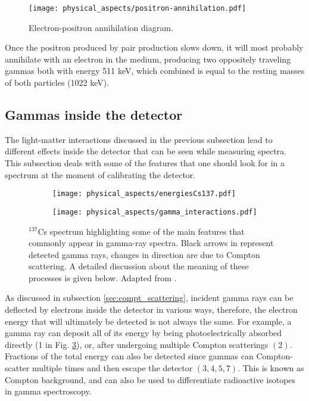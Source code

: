 \begin{figure}[H]
  \centering
  \texttt{[image: physical\_aspects/positron-annihilation.pdf]}
  \caption{\label{fig:positron_annihilation_diagram}Electron-positron annihilation diagram.}
\end{figure}

Once the positron produced by pair production slows down, it will most probably annihilate with an electron in the medium, producing two oppositely traveling gammas both with energy 511 \unit{\kilo\eV}, which combined is equal to the resting masses of both particles (1022 \unit{\kilo\eV}).

\subsection{Gammas inside the detector}\label{sec:gammas_in_the_detector}

The light-matter interactions discussed in the previous subsection lead to different effects inside the detector that can be seen while measuring spectra. This subsection deals with some of the features that one should look for in a spectrum at the moment of calibrating the detector.

\begin{figure}[H]
  \centering
  \begin{subfigure}[t]{0.7\textwidth}
    \texttt{[image: physical\_aspects/energiesCs137.pdf]}
    \caption{\label{sfig:spectrum_description}}
  \end{subfigure}
  \hfill
  \begin{subfigure}[t]{0.28\textwidth}
    \texttt{[image: physical\_aspects/gamma\_interactions.pdf]}
    \caption{\label{sfig:gamma_scattering}}
  \end{subfigure}
  \caption{\label{fig:Cs137_description}$^{137}$Cs spectrum highlighting some of the main features that commonly appear in gamma-ray spectra. Black arrows in  represent detected gamma rays, changes in direction are due to Compton scattering. A detailed discussion about the meaning of these processes is given below. Adapted from \cite{Notas-instrumentacion}.}
\end{figure}

As discussed in subsection \ref{sec:compt_scattering}, incident gamma rays can be deflected by electrons inside the detector in various ways, therefore, the electron energy that will ultimately be detected is not always the same. For example, a gamma ray can deposit all of its energy by being photoelectrically absorbed directly (1 in Fig. \ref{sfig:gamma_scattering}), or, after undergoing multiple Compton scatterings $(2)$. Fractions of the total energy can also be detected since gammas can Compton-scatter multiple times and then escape the detector $(3, 4, 5, 7)$. This is known as Compton background, and can also be used to differentiate radioactive isotopes in gamma spectroscopy.

